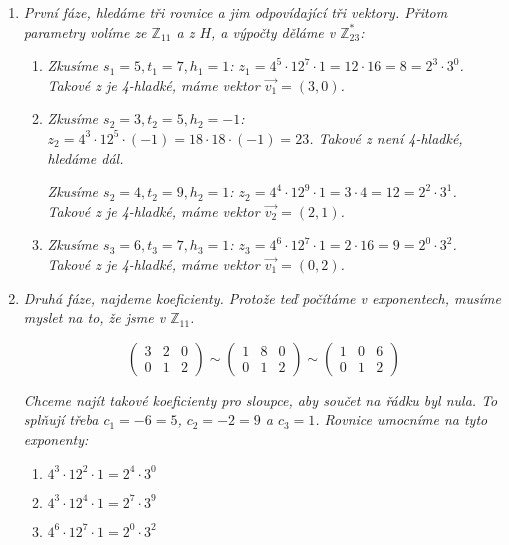 \documentclass[10pt,a4paper]{article}
\begin{document}
\begin{enumerate}

\item \textit{První fáze, hledáme tři rovnice a jim odpovídající tři vektory. Přitom parametry volíme ze $\mathbb{Z}_{11}$ a z $H$, a výpočty děláme v $\mathbb{Z}_{23}^*$:}

\begin{enumerate}
\item \textit{Zkusíme $s_1 = 5, t_1 = 7, h_1 = 1$: $z_1 = 4^5 \cdot 12^7 \cdot 1 = 12 \cdot 16 = 8 = 2^3 \cdot 3^0$. Takové z je 4-hladké, máme vektor $\vec{v_1} = (3, 0)$.}
\item \textit{Zkusíme $s_2 = 3, t_2 = 5, h_2 = -1$: $z_2 = 4^3 \cdot 12^5 \cdot (-1) = 18 \cdot 18 \cdot (-1) = 23 $. Takové z není 4-hladké, hledáme dál.}

\textit{Zkusíme $s_2 = 4, t_2 = 9, h_2 = 1$: $z_2 = 4^4 \cdot 12^9 \cdot 1= 3 \cdot 4 = 12 = 2^2 \cdot 3^1 $. Takové z je 4-hladké, máme vektor $\vec{v_2} = (2, 1)$.}
\item \textit{Zkusíme $s_3 = 6, t_3 = 7, h_3 = 1$: $z_3 = 4^6 \cdot 12^7 \cdot 1 = 2 \cdot 16 = 9 = 2^0 \cdot 3^2$. Takové z je 4-hladké, máme vektor $\vec{v_1} = (0, 2)$.}
\end{enumerate}
\item \textit{Druhá fáze, najdeme koeficienty. Protože teď počítáme v exponentech, musíme myslet na to, že jsme v $\mathbb{Z}_{11}$.}

\[ \left( \begin{array}{ccc}
3 & 2 & 0\\
0 & 1 & 2
\end{array} \right)
%
\sim
%
\left( \begin{array}{ccc}
1 & 8 & 0\\
0 & 1 & 2
\end{array} \right)
%
\sim
%
\left( \begin{array}{ccc}
1 & 0 & 6\\
0 & 1 & 2
\end{array} \right)
\]

\textit{Chceme najít takové koeficienty pro sloupce, aby součet na řádku byl nula. To splňují třeba $c_1 = -6 = 5$, $c_2 = -2 = 9$ a $c_3 = 1$.  Rovnice umocníme na tyto exponenty:}

\begin{enumerate}
\item $4^3\cdot 12^2 \cdot 1 = 2^4\cdot 3^0$
\item $4^3\cdot 12^4 \cdot 1 = 2^7\cdot 3^9$
\item $4^6\cdot 12^7 \cdot 1 = 2^0\cdot 3^2$
\end{enumerate}


\end{enumerate}
\end{document}
